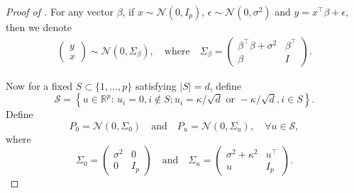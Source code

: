 \documentclass[twoside]{article}
\begin{document}
\begin{proof}[Proof of ]
For any vector $\beta$, if $x \sim \mathcal{N}(0, I_p)$, $\epsilon \sim \mathcal{N}(0, \sigma^2)$ and $y = x^{\top} \beta + \epsilon$, then we denote
	\begin{align*}
		\left(\begin{array}{c} 
			y \\
			x
		\end{array}\right) \sim \mathcal{N}\left(0, \Sigma_\beta\right), \quad \mbox{where}  \quad \Sigma_{\beta} = \left(\begin{array}{cc} 
			\beta^{\top}\beta + \sigma^2 & \beta^{\top} \\
			\beta & I
 		\end{array}\right).
	\end{align*}

Now for a fixed $S \subset \{1, \ldots, p\}$ satisfying $|S| = d$, define
	\[
		\mathcal{S} = \left\{u \in \mathbb{R}^p: \, u_i = 0, i \notin S; u_i = \kappa/\sqrt{d} \mbox{ or } -\kappa/\sqrt{d}, i \in S\right\}.
	\]
	Define 
	\[
		P_0 = \mathcal{N}\left(0, \Sigma_0\right) \quad \mbox{and} \quad P_u = \mathcal{N}\left(0, \Sigma_u\right), \quad \forall u \in \mathcal{S},
	\]
	where 
	\[
		\Sigma_0 = \left(\begin{array}{cc}
			\sigma^2 & 0 \\
			0 & I_p
		 \end{array}\right) \quad \mbox{and} \quad \Sigma_u = \left(\begin{array}{cc}
			\sigma^2 + \kappa^2 & u^{\top} \\
			u & I_p	
		 \end{array}\right).
	\]


\end{proof}
\end{document}
